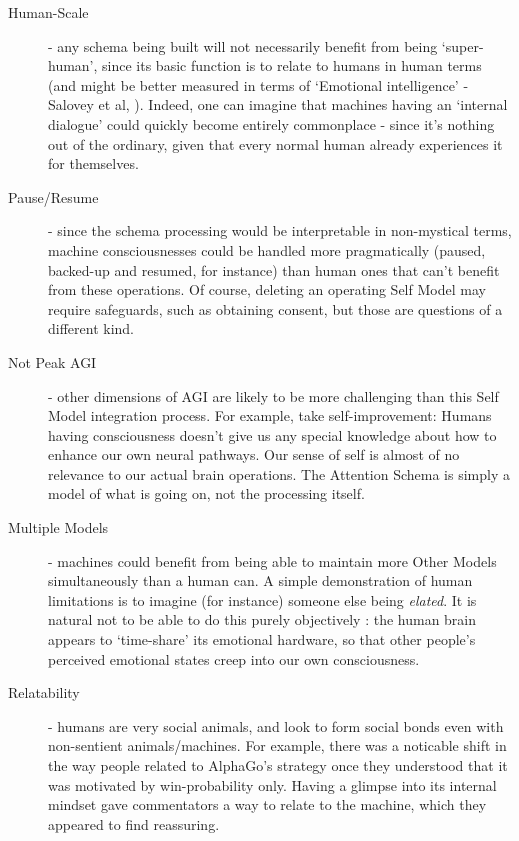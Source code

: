 \documentclass[citeauthoryear]{llncs}
\begin{document}
\begin{description}

\item[Human-Scale] - any schema being built will not necessarily
benefit from being `super-human', since its basic function is to relate to
humans in human terms (and might be better measured in terms of `Emotional intelligence' - 
Salovey et al, \cite{EmotionalIntelligence}).
%
Indeed, one can imagine that machines having an `internal dialogue' could
quickly become entirely commonplace - since it's nothing out of the ordinary, 
given that every normal human already experiences it for themselves.

\item[Pause/Resume] - since the schema processing would be interpretable
in non-mystical terms, machine consciousnesses could be handled more pragmatically 
(paused, backed-up and resumed, for instance) than human ones that can't 
benefit from these operations.  
%
Of course, deleting an operating Self Model may require safeguards, 
such as obtaining consent, but those are questions of a different kind.

\item[Not Peak AGI] - other dimensions of AGI are likely to be more challenging
than this Self Model integration process.
%
For example, take self-improvement: Humans having consciousness doesn't 
give us any special knowledge about how to enhance our own neural pathways.
Our sense of self is almost of no relevance to our actual brain operations.
The Attention Schema is simply a model of what is going on, not the processing
itself. 

\item[Multiple Models] - machines could benefit from being able to maintain
more Other Models simultaneously than a human can.  A simple demonstration of 
human limitations is to imagine (for instance) someone else being \emph{elated}.  
It is natural not to be able to do this purely objectively : the human brain 
appears to `time-share' its emotional hardware, so that other people's perceived 
emotional states creep into our own consciousness.

\item[Relatability] - humans are very social animals, and look to form 
social bonds even with non-sentient animals/machines.  For example, 
there was a noticable shift in the way people related to AlphaGo's strategy 
once they understood that it was motivated by win-probability only.
Having a glimpse into its internal mindset gave commentators a way to 
relate to the machine, which they appeared to find reassuring.


\end{description}
\end{document}
